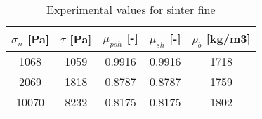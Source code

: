 \begin{table}[h]
\centering
\begin{tabular}{ccccc}
$\sigma_n$ [Pa] & $\tau$ [Pa] & $\mu_{psh}$ [-] & $\mu_{sh}$ [-] &
$\rho_b$ [kg/m3] \\
\hline
    1068  & 1059  & 0.9916 & 0.9916 & 1718 \\
    2069  & 1818  & 0.8787 & 0.8787 & 1759 \\
    10070 & 8232  & 0.8175 & 0.8175 & 1802 \\

\hline
\end{tabular}
\caption{Experimental values for sinter fine}
\label{tab:05sinterTableExperimental}
\end{table}